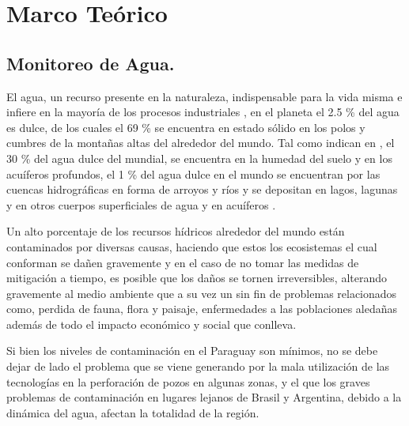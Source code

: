 
\chapter[Marco Te\'orico.]{Marco Te\'orico\label{etiqueta}}


\section{Monitoreo de Agua.}
El agua, un recurso presente en la naturaleza, indispensable para la vida misma e infiere en la mayoría de los procesos industriales \cite{estudio_agua}, en el planeta el 2.5 \% del agua es dulce, de los cuales el 69 \% se encuentra en estado sólido en los polos y cumbres de la monta\~nas altas del alrededor del mundo. Tal como indican en \cite{junta-municipal-de-agua-potable-y-alcantarillado-de-mazatlan-no-date}, el 30 \% del agua dulce del mundial, se encuentra en la humedad del suelo y en los acuíferos profundos, el 1 \% del agua dulce en el mundo se encuentran por las cuencas hidrográficas en forma de arroyos y ríos y se depositan en lagos, lagunas y en otros cuerpos superficiales de agua y en acuíferos  \cite{junta-municipal-de-agua-potable-y-alcantarillado-de-mazatlan-no-date}.

Un alto porcentaje de los recursos h\'idricos alrededor del mundo están contaminados por diversas causas, haciendo que estos los ecosistemas el cual conforman se dañen gravemente y en el caso de no tomar las medidas de mitigación a tiempo, es posible que los da\~nos se tornen irreversibles, alterando gravemente al medio ambiente que a su vez un sin fin de problemas relacionados como, perdida de fauna, flora y paisaje, enfermedades a las poblaciones aledañas además de todo el impacto económico y social que conlleva.

Si bien los niveles de contaminación en el Paraguay son mínimos, no se debe dejar de lado el problema que se viene generando por la mala utilización de las tecnologías en la perforación de pozos en algunas zonas, y el que los graves problemas de contaminación en lugares lejanos de Brasil y Argentina, debido a la dinámica del agua, afectan la totalidad de la región.
\cite{saladuenas015}

